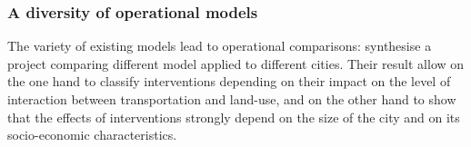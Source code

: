 \documentclass[10pt]{article}
\begin{document}

\subsubsection{A diversity of operational models}

The variety of existing models lead to operational comparisons: \cite{paulley1991overview} synthesise a project comparing different model applied to different cities. Their result allow on the one hand to classify interventions depending on their impact on the level of interaction between transportation and land-use, and on the other hand to show that the effects of interventions strongly depend on the size of the city and on its socio-economic characteristics.
\end{document}
